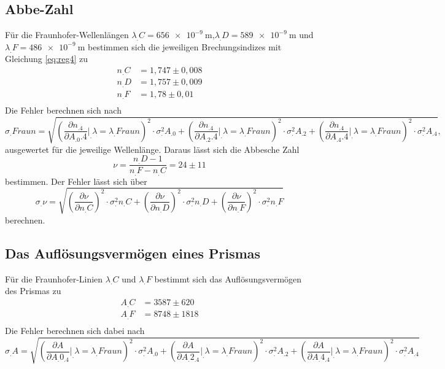 \subsection{Abbe-Zahl}
Für die Fraunhofer-Wellenlängen $\lambda_.C=\SI{656e-9}{\metre}$,$\lambda_.D=\SI{589e-9}{\metre}$ und $\lambda_.F=\SI{486e-9}{\metre}$ bestimmen sich die jeweiligen Brechungsindizes mit Gleichung \eqref{eq:reg4} zu
\begin{align*}
n_.C&=1,747\pm 0,008\\
n_.D&=1,757\pm 0,009\\
n_.F&=1,78\pm 0,01\\
\end{align*}
Die Fehler berechnen sich nach
\[
\sigma_.{Fraun}=\sqrt{\left(\frac{\partial n_.4}{\partial A_.0.4}\bigg|_.{\lambda=\lambda_.Fraun}\right)^2\cdot\sigma^2_.{A_.0}+\left(\frac{\partial n_.4}{\partial A_.2.4}\bigg|_.{\lambda=\lambda_.Fraun}\right)^2\cdot\sigma^2_.{A_.2}+\left(\frac{\partial n_.4}{\partial A_.4.4}\bigg|_.{\lambda=\lambda_.Fraun}\right)^2\cdot\sigma^2_.{A_.4}},
\]
ausgewertet für die jeweilige Wellenlänge.
Daraus lässt sich die Abbesche Zahl 
\[
\nu = \frac{n_.D-1}{n_.F-n_.C}=24 \pm 11
\]
bestimmen.
Der Fehler lässt sich über
\[
\sigma_.{\nu}=\sqrt{\left(\frac{\partial\nu}{\partial n_.C}\right)^2\cdot\sigma^2_.{n_.C} + \left(\frac{\partial\nu}{\partial n_.D}\right)^2\cdot\sigma^2_.{n_.D} + \left(\frac{\partial\nu}{\partial n_.F}\right)^2\cdot\sigma^2_.{n_.F}}
\]
berechnen.
\subsection{Das Auflösungsvermögen eines Prismas}
Für die Fraunhofer-Linien $\lambda_.C$ und $\lambda_.F$ bestimmt sich das Auflösungsvermögen des Prismas zu
\begin{align*}
A_.C&=3587\pm 620\\
A_.F&=8748\pm 1818\\
\end{align*}
Die Fehler berechnen sich dabei nach
\[
\sigma_.A=\sqrt{\left(\frac{\partial A}{\partial A_.{0_.4}}\bigg|_.{\lambda=\lambda_.{Fraun}}\right)^2\cdot\sigma^2_.{A_.0}+\left(\frac{\partial A}{\partial A_.{2_.4}}\bigg|_.{\lambda=\lambda_.{Fraun}}\right)^2\cdot\sigma^2_.{A_.2}+\left(\frac{\partial A}{\partial A_.{4_.4}}\bigg|_.{\lambda=\lambda_.{Fraun}}\right)^2\cdot\sigma^2_.{A_.4}}
\]